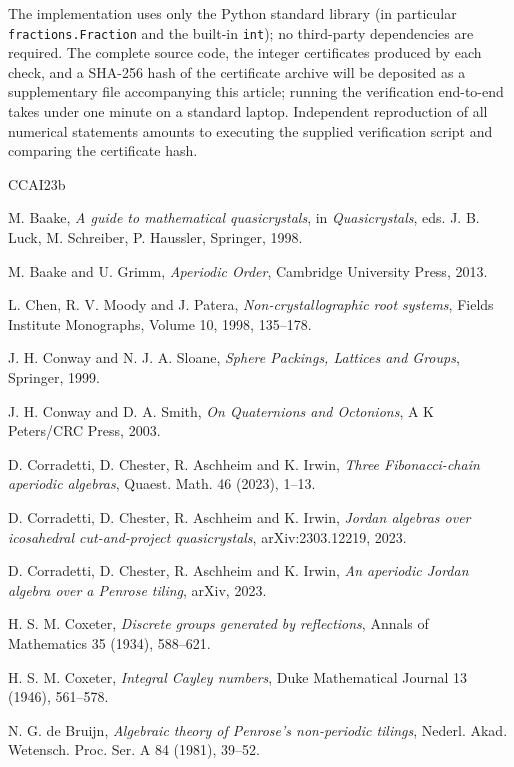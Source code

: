 \documentclass[12pt,oneside,english]{amsart}
\numberwithin{equation}{section}
\numberwithin{figure}{section}
\numberwithin{table}{section}
\theoremstyle{plain}
\theoremstyle{definition}
\theoremstyle{remark}
\begin{document}
The implementation uses only the Python standard library (in particular \texttt{fractions.Fraction} and the built-in \texttt{int}); no third-party dependencies are required. The complete source code, the integer certificates produced by each check, and a SHA-256 hash of the certificate archive will be deposited as a supplementary file accompanying this article; running the verification end-to-end takes under one minute on a standard laptop. Independent reproduction of all numerical statements amounts to executing the supplied verification script and comparing the certificate hash.

\begin{thebibliography}{CCAI23b}

M. Baake, \emph{A guide to mathematical quasicrystals}, in \emph{Quasicrystals}, eds. J. B. Luck, M. Schreiber, P. Haussler, Springer, 1998.

M. Baake and U. Grimm, \emph{Aperiodic Order}, Cambridge University Press, 2013.

L. Chen, R. V. Moody and J. Patera, \emph{Non-crystallographic root systems}, Fields Institute Monographs, Volume 10, 1998, 135--178.

J. H. Conway and N. J. A. Sloane, \emph{Sphere Packings, Lattices and Groups}, Springer, 1999.

J. H. Conway and D. A. Smith, \emph{On Quaternions and Octonions}, A K Peters/CRC Press, 2003.

D. Corradetti, D. Chester, R. Aschheim and K. Irwin, \emph{Three Fibonacci-chain aperiodic algebras}, Quaest. Math. 46 (2023), 1--13.

D. Corradetti, D. Chester, R. Aschheim and K. Irwin, \emph{Jordan algebras over icosahedral cut-and-project quasicrystals}, arXiv:2303.12219, 2023.

D. Corradetti, D. Chester, R. Aschheim and K. Irwin, \emph{An aperiodic Jordan algebra over a Penrose tiling}, arXiv, 2023.

H. S. M. Coxeter, \emph{Discrete groups generated by reflections}, Annals of Mathematics 35 (1934), 588--621.

H. S. M. Coxeter, \emph{Integral Cayley numbers}, Duke Mathematical Journal 13 (1946), 561--578.

N. G. de Bruijn, \emph{Algebraic theory of Penrose's non-periodic tilings}, Nederl. Akad. Wetensch. Proc. Ser. A 84 (1981), 39--52.


\end{thebibliography}
\end{document}
